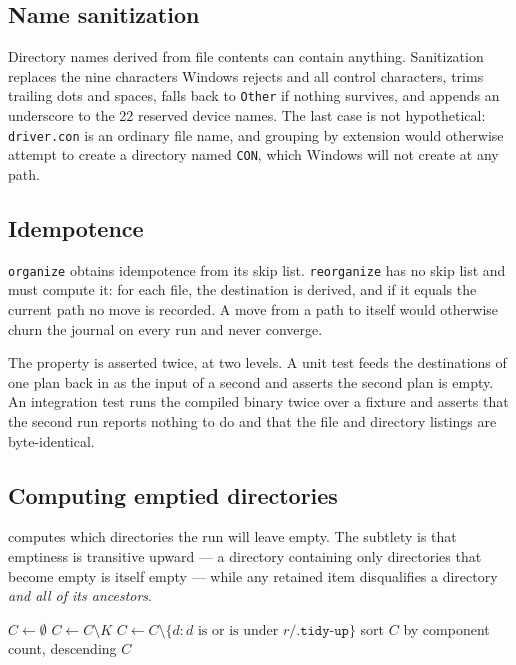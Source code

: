 \documentclass[11pt,a4paper]{article}
\newcommand{\code}[1]{\texttt{\small #1}}
\begin{document}
\subsection{Name sanitization}

Directory names derived from file contents can contain anything. Sanitization
replaces the nine characters Windows rejects and all control characters, trims
trailing dots and spaces, falls back to \code{Other} if nothing survives, and appends
an underscore to the 22 reserved device names. The last case is not hypothetical:
\code{driver.con} is an ordinary file name, and grouping by extension would otherwise
attempt to create a directory named \code{CON}, which Windows will not create at any
path.

\subsection{Idempotence}

\code{organize} obtains idempotence from its skip list. \code{reorganize} has no skip
list and must compute it: for each file, the destination is derived, and if it equals
the current path no move is recorded. A move from a path to itself would otherwise
churn the journal on every run and never converge.

The property is asserted twice, at two levels. A unit test feeds the destinations of
one plan back in as the input of a second and asserts the second plan is empty. An
integration test runs the compiled binary twice over a fixture and asserts that the
second run reports nothing to do and that the file and directory listings are
byte-identical.

\subsection{Computing emptied directories}

 computes which directories the run will leave empty. The subtlety
is that emptiness is transitive upward --- a directory containing only directories that
become empty is itself empty --- while any retained item disqualifies a directory
\emph{and all of its ancestors}.

\begin{algorithm}[t]
\SetAlgoLined
\DontPrintSemicolon
{}
$C \leftarrow \emptyset$\;
$C \leftarrow C \setminus K$ 
$C \leftarrow C \setminus \{d : d \text{ is or is under } r/\texttt{.tidy-up}\}$\;
sort $C$ by component count, descending\;
\Return $C$\;
\caption{\textsc{EmptiedDirectories}}
\label{alg:emptied}
\end{algorithm}
\end{document}
